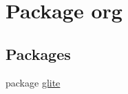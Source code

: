 \hypertarget{namespaceorg}{
\section{Package org}
\label{namespaceorg}
}
\subsection*{Packages}
\begin{DoxyCompactItemize}
\item 
package \hyperlink{namespaceorg_1_1glite}{glite}
\end{DoxyCompactItemize}
